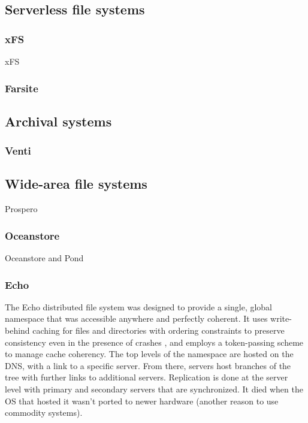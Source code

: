 \subsection{Serverless file systems}
\cite{douceur01}\cite{douceur02}
\subsubsection{xFS}
xFS\cite{wang93,anderson95b,wang98}
\subsubsection{Farsite}
\cite{bolosky,adya}

\subsection{Archival systems}

\subsubsection{Venti}
\cite{quinlan}

\subsection{Wide-area file systems}
Prospero \cite{neuman}

\subsubsection{Oceanstore}
Oceanstore and Pond \cite{kubiatowicz,rhea}

\subsubsection{Echo}

The Echo distributed file system \cite{birrell93} was designed to provide a single, global namespace that was accessible anywhere and perfectly coherent. It uses write-behind caching for files and directories with ordering constraints to preserve consistency even in the presence of crashes \cite{mann}, and employs a token-passing scheme to manage cache coherency. The top levels of the namespace are hosted on the DNS, with a link to a specific server. From there, servers host branches of the tree with further links to additional servers. Replication is done at the server level with primary and secondary servers that are synchronized. It died when the OS that hosted it wasn't ported to newer hardware (another reason to use commodity systems).

